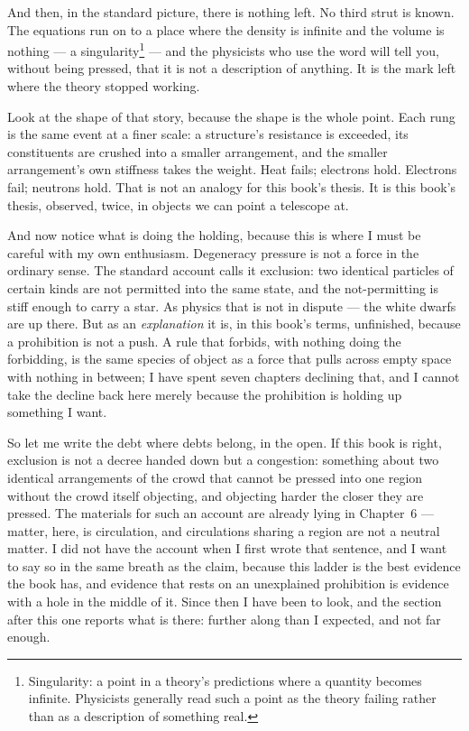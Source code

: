 \documentclass[fontsize=11pt,paper=a4,pagesize=auto,parskip=half-]{scrbook}
\begin{document}
And then, in the standard picture, there is nothing left. No third strut is known. The equations run on to a place where the density is infinite and the volume is nothing --- a singularity\footnote{Singularity: a point in a theory's predictions where a quantity becomes infinite. Physicists generally read such a point as the theory failing rather than as a description of something real.} --- and the physicists who use the word will tell you, without being pressed, that it is not a description of anything. It is the mark left where the theory stopped working.

Look at the shape of that story, because the shape is the whole point. Each rung is the same event at a finer scale: a structure's resistance is exceeded, its constituents are crushed into a smaller arrangement, and the smaller arrangement's own stiffness takes the weight. Heat fails; electrons hold. Electrons fail; neutrons hold. That is not an analogy for this book's thesis. It is this book's thesis, observed, twice, in objects we can point a telescope at.

And now notice what is doing the holding, because this is where I must be careful with my own enthusiasm. Degeneracy pressure is not a force in the ordinary sense. The standard account calls it exclusion: two identical particles of certain kinds are not permitted into the same state, and the not-permitting is stiff enough to carry a star. As physics that is not in dispute --- the white dwarfs are up there. But as an \emph{explanation} it is, in this book's terms, unfinished, because a prohibition is not a push. A rule that forbids, with nothing doing the forbidding, is the same species of object as a force that pulls across empty space with nothing in between; I have spent seven chapters declining that, and I cannot take the decline back here merely because the prohibition is holding up something I want.

So let me write the debt where debts belong, in the open. If this book is right, exclusion is not a decree handed down but a congestion: something about two identical arrangements of the crowd that cannot be pressed into one region without the crowd itself objecting, and objecting harder the closer they are pressed. The materials for such an account are already lying in Chapter~6 --- matter, here, is circulation, and circulations sharing a region are not a neutral matter. I did not have the account when I first wrote that sentence, and I want to say so in the same breath as the claim, because this ladder is the best evidence the book has, and evidence that rests on an unexplained prohibition is evidence with a hole in the middle of it. Since then I have been to look, and the section after this one reports what is there: further along than I expected, and not far enough.
\end{document}
